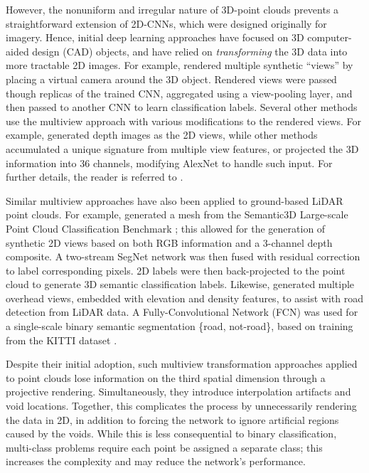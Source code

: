 \documentclass[final,3p,times,twocolumn,authoryear]{elsarticle}
\begin{document}
However, the nonuniform and irregular nature of 3D-point clouds prevents a straightforward extension of 2D-CNNs, which were designed originally for imagery. Hence, initial deep learning approaches have focused on 3D computer-aided design (CAD) objects, and have relied on \emph{transforming} the 3D data into more tractable 2D images. 
For example, \citet{MVCNN} rendered multiple synthetic ``views'' by placing a virtual camera around the 3D object.
Rendered views were passed though replicas of the trained CNN, aggregated using a view-pooling layer, and then passed to another CNN to learn classification labels. 
Several other methods use the multiview approach with various modifications to the rendered views. 
For example, \citet{GIFT} generated depth images as the 2D views, while other methods accumulated a unique signature from multiple view features, or projected the 3D information into 36 channels, modifying AlexNet \citep{Alex_NIPS2012} to handle such input. 
For further details, the reader is referred to \citep{shrec}. 


Similar multiview approaches have also been applied to ground-based LiDAR point clouds.
For example, \citet{Boulch_3D} generated a mesh from the Semantic3D Large-scale Point Cloud Classification Benchmark \citep{hackel2017semantic3d}; this allowed for the generation of synthetic 2D views based on both RGB information and a 3-channel depth composite. 
A two-stream SegNet \citep{Segnet_PAMI} network was then fused with residual correction \citep{Audebert2016SemanticSO} to label corresponding pixels. 
2D labels were then back-projected to the point cloud to generate 3D semantic classification labels. 
Likewise, \citet{Luca} generated multiple overhead views, embedded with elevation and density features, to assist with road detection from LiDAR data. 
A Fully-Convolutional Network (FCN) \citep{FCN} was used for a single-scale binary semantic segmentation \{road, not-road\}, based on training from the KITTI dataset \citep{KITTI}. 

Despite their initial adoption, such multiview transformation approaches applied to point clouds lose information on the third spatial dimension through a projective rendering.
Simultaneously, they introduce interpolation artifacts and void locations.
Together, this complicates the process by unnecessarily rendering the data in 2D, in addition to forcing the network to ignore artificial regions caused by the voids.
While this is less consequential to binary classification,  multi-class problems require each point be assigned a separate class; this increases the complexity and may reduce the network's performance. %
\end{document}
